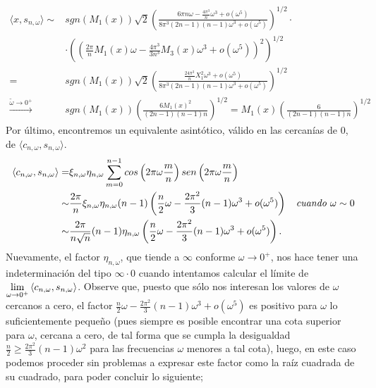 \begin{align*}
\langle x,
s_{n, \omega}
\rangle \sim &
sgn(M_{1}(x))
\sqrt{2} 
\left(
\frac{
6 \pi n \omega -
\frac{4 \pi^{3}}{n} \omega^{3} + o(\omega^{5})
}{8 \pi^{3} (2n-1)(n-1)\omega^{3} + o(\omega^{5})
}
\right)^{1/2}
\cdot \\
& \cdot
\left(
\left(
\frac{2 \pi}{n} M_{1}(x) \omega - \frac{4 \pi^{3}}{3n^{3}}M_{3}(x) \omega^{3} 
 + o(\omega^{5})
\right)^{2}
\right)^{1/2}\\
= & 
sgn(M_{1}(x)) \sqrt{2} \left(
\frac{
\frac{24 \pi^{3}}{n}X_{1}^{2}\omega^{3} + o(\omega^{5}) }{
8 \pi^{3} (2n-1)(n-1)\omega^{3} + o(\omega^{5})
}
\right)^{1/2} \\
\xrightarrow{\tilde{\omega} \rightarrow 0^{+}}& sgn(M_{1}(x))\left(
\frac{6 M_{1}(x)^{2}}{(2n-1)(n-1)n}
\right)^{1/2} 
= M_{1}(x) 
\left(
\frac{6 }{(2n-1)(n-1)n}
\right)^{1/2} 
\end{align*}
Por último, encontremos un equivalente
asintótico, válido en las cercanías de $0$, de 
$\langle
c_{n, \omega}, s_{n, \omega}
\rangle $.
\begin{align*}
\langle
c_{n, \omega}, s_{n, \omega}
\rangle = &
\xi_{n, \omega} \eta_{n, \omega}
\sum\limits_{m=0}^{n-1}
cos\left(
2 \pi \omega\frac{m}{n}
\right)
sen\left(
2 \pi \omega\frac{m}{n}
\right)
 \\
\sim &
\frac{2\pi}{n}
\xi_{n, \omega} \eta_{n, \omega}
(n-1)  
\left(
\frac{n}{2} \omega - \frac{2\pi^{2}}{3} (n-1) \omega^{3} + o(\omega^{5})
\right) 
\hspace{0.2cm} \textit{ cuando } \omega \sim 0
\\
\sim &
\frac{2\pi}{n \sqrt{n}}
(n-1) 
\eta_{n, \omega} 
\left(
\frac{n}{2} \omega - \frac{2\pi^{2}}{3} (n-1) \omega^{3} + o(\omega^{5})
\right). \\
\end{align*}
Nuevamente, el factor 
$\eta_{n, \omega}$, que tiende a $\infty$
conforme $\omega \rightarrow 0^{+}$,
nos hace tener una indeterminación
del tipo $\infty \cdot 0$
cuando intentamos calcular el límite
de 
$
\lim\limits_{\omega \rightarrow 0^{+}}{
\langle
c_{n, \omega}, s_{n, \omega}
\rangle}
$.
Observe que, puesto que sólo nos interesan los valores
de $\omega$ cercanos a cero, el factor 
$
\frac{n}{2} \omega - \frac{2\pi^{2}}{3} (n-1) \omega^{3} + o(\omega^{5})
$
es positivo 
para $\omega$ lo suficientemente pequeño
(pues siempre es posible encontrar una cota
superior para $\omega$, cercana a cero, de tal forma que se 
cumpla la desigualdad $\frac{n}{2} \geq \frac{2 \pi^{2}}{3}(n-1)
\omega^{2}$ para las frecuencias $\omega$ menores a tal cota), luego, 
en este caso podemos proceder sin problemas a expresar este
factor
como la raíz cuadrada de su cuadrado, para poder concluir lo siguiente; 


